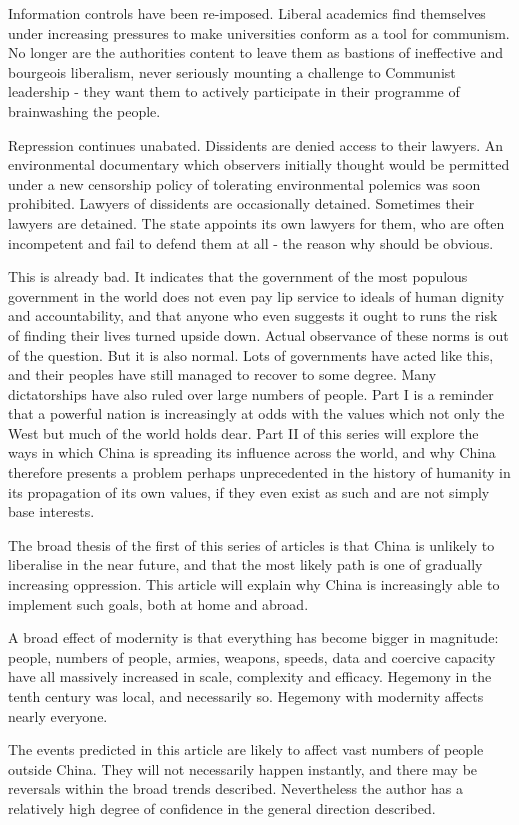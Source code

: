 \documentclass[11pt,a4paper]{report}
\newcounter{count}
\begin{document}
\begin{multicols}{2}
Information controls have been re-imposed. Liberal academics find themselves under increasing pressures to make universities conform as a tool for communism. No longer are the authorities content to leave them as bastions of ineffective and bourgeois liberalism, never seriously mounting a challenge to Communist leadership - they want them to actively participate in their programme of brainwashing the people.

Repression continues unabated. Dissidents are denied access to their lawyers. An environmental documentary which observers initially thought would be permitted under a new censorship policy of tolerating environmental polemics was soon prohibited. Lawyers of dissidents are occasionally detained. Sometimes their lawyers are detained. The state appoints its own lawyers for them, who are often incompetent and fail to defend them at all - the reason why should be obvious.

This is already bad. It indicates that the government of the most populous government in the world does not even pay lip service to ideals of human dignity and accountability, and that anyone who even suggests it ought to runs the risk of finding their lives turned upside down. Actual observance of these norms is out of the question. But it is also normal. Lots of governments have acted like this, and their peoples have still managed to recover to some degree. Many dictatorships have also ruled over large numbers of people. Part I is a reminder that a powerful nation is increasingly at odds with the values which not only the West but much of the world holds dear. Part II of this series will explore the ways in which China is spreading its influence across the world, and why China therefore presents a problem perhaps unprecedented in the history of humanity in its propagation of its own values, if they even exist as such and are not simply base interests.

The broad thesis of the first of this series of articles is that China
is unlikely to liberalise in the near future, and that the most likely
path is one of gradually increasing oppression. This article will
explain why China is increasingly able to implement such goals, both at
home and abroad.

A broad effect of modernity is that everything has become bigger in
magnitude: people, numbers of people, armies, weapons, speeds, data and
coercive capacity have all massively increased in scale, complexity and
efficacy. Hegemony in the tenth century was local, and necessarily so.
Hegemony with modernity affects nearly everyone.

The events predicted in this article are likely to affect vast numbers
of people outside China. They will not necessarily happen instantly, and
there may be reversals within the broad trends described. Nevertheless
the author has a relatively high degree of confidence in the general
direction described.

\end{multicols}
\end{document}
